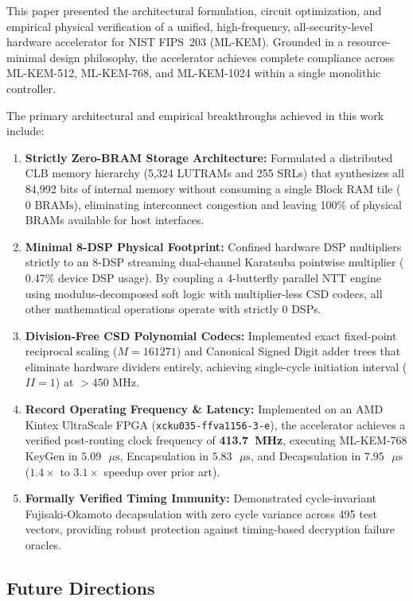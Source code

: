 This paper presented the architectural formulation, circuit optimization, and empirical physical verification of a unified, high-frequency, all-security-level hardware accelerator for NIST FIPS~203 (ML-KEM). Grounded in a resource-minimal design philosophy, the accelerator achieves complete compliance across ML-KEM-512, ML-KEM-768, and ML-KEM-1024 within a single monolithic controller.

The primary architectural and empirical breakthroughs achieved in this work include:
\begin{enumerate}
    \item \textbf{Strictly Zero-BRAM Storage Architecture:} Formulated a distributed CLB memory hierarchy (5,324 LUTRAMs and 255 SRLs) that synthesizes all 84,992 bits of internal memory without consuming a single Block RAM tile ($0\text{ BRAMs}$), eliminating interconnect congestion and leaving 100\% of physical BRAMs available for host interfaces.
    \item \textbf{Minimal 8-DSP Physical Footprint:} Confined hardware DSP multipliers strictly to an 8-DSP streaming dual-channel Karatsuba pointwise multiplier ($0.47\%$ device DSP usage). By coupling a 4-butterfly parallel NTT engine using modulus-decomposed soft logic with multiplier-less CSD codecs, all other mathematical operations operate with strictly 0 DSPs.
    \item \textbf{Division-Free CSD Polynomial Codecs:} Implemented exact fixed-point reciprocal scaling ($M = 161271$) and Canonical Signed Digit adder trees that eliminate hardware dividers entirely, achieving single-cycle initiation interval ($II = 1$) at $>450\text{ MHz}$.
    \item \textbf{Record Operating Frequency \& Latency:} Implemented on an AMD Kintex UltraScale FPGA (\texttt{xcku035-ffva1156-3-e}), the accelerator achieves a verified post-routing clock frequency of \textbf{413.7~MHz}, executing ML-KEM-768 KeyGen in $5.09\text{ }\mu\text{s}$, Encapsulation in $5.83\text{ }\mu\text{s}$, and Decapsulation in $7.95\text{ }\mu\text{s}$ ($1.4\times$ to $3.1\times$ speedup over prior art).
    \item \textbf{Formally Verified Timing Immunity:} Demonstrated cycle-invariant Fujisaki-Okamoto decapsulation with zero cycle variance across 495 test vectors, providing robust protection against timing-based decryption failure oracles.
\end{enumerate}

\subsection{Future Directions}
\label{sec:conclusion_future}

